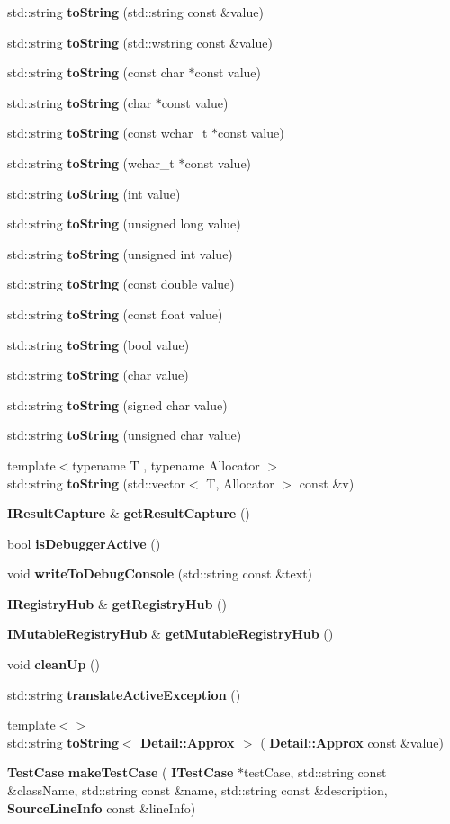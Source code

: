 \begin{DoxyCompactItemize}
std\+::string \textbf{ to\+String} (std\+::string const \&value)
\item 
std\+::string \textbf{ to\+String} (std\+::wstring const \&value)
\item 
std\+::string \textbf{ to\+String} (const char $\ast$const value)
\item 
std\+::string \textbf{ to\+String} (char $\ast$const value)
\item 
std\+::string \textbf{ to\+String} (const wchar\+\_\+t $\ast$const value)
\item 
std\+::string \textbf{ to\+String} (wchar\+\_\+t $\ast$const value)
\item 
std\+::string \textbf{ to\+String} (int value)
\item 
std\+::string \textbf{ to\+String} (unsigned long value)
\item 
std\+::string \textbf{ to\+String} (unsigned int value)
\item 
std\+::string \textbf{ to\+String} (const double value)
\item 
std\+::string \textbf{ to\+String} (const float value)
\item 
std\+::string \textbf{ to\+String} (bool value)
\item 
std\+::string \textbf{ to\+String} (char value)
\item 
std\+::string \textbf{ to\+String} (signed char value)
\item 
std\+::string \textbf{ to\+String} (unsigned char value)
\item 
{\footnotesize template$<$typename T , typename Allocator $>$ }\\std\+::string \textbf{ to\+String} (std\+::vector$<$ T, Allocator $>$ const \&v)
\item 
\textbf{ I\+Result\+Capture} \& \textbf{ get\+Result\+Capture} ()
\item 
bool \textbf{ is\+Debugger\+Active} ()
\item 
void \textbf{ write\+To\+Debug\+Console} (std\+::string const \&text)
\item 
\textbf{ I\+Registry\+Hub} \& \textbf{ get\+Registry\+Hub} ()
\item 
\textbf{ I\+Mutable\+Registry\+Hub} \& \textbf{ get\+Mutable\+Registry\+Hub} ()
\item 
void \textbf{ clean\+Up} ()
\item 
std\+::string \textbf{ translate\+Active\+Exception} ()
\item 
{\footnotesize template$<$$>$ }\\std\+::string \textbf{ to\+String$<$ Detail\+::\+Approx $>$} (\textbf{ Detail\+::\+Approx} const \&value)
\item 
\textbf{ Test\+Case} \textbf{ make\+Test\+Case} (\textbf{ I\+Test\+Case} $\ast$test\+Case, std\+::string const \&class\+Name, std\+::string const \&name, std\+::string const \&description, \textbf{ Source\+Line\+Info} const \&line\+Info)
\end{DoxyCompactItemize}


